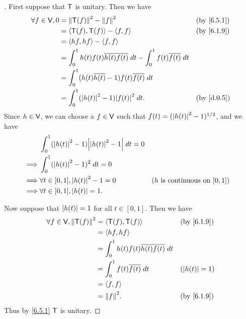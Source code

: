 \begin{proof}[]
  First suppose that \(\mathsf{T}\) is unitary.
  Then we have
  \begin{align*}
    \forall f \in \V, 0 & = \norm{\T(f)}^2 - \norm{f}^2                                                 &  & \by{6.5.1} \\
                        & = \inn{\T(f), \T(f)} - \inn{f, f}                                             &  & \by{6.1.9} \\
                        & = \inn{hf, hf} - \inn{f, f}                                                                   \\
                        & = \int_0^1 h(t) f(t) \conj{h(t) f(t)} \; dt - \int_0^1 f(t) \conj{f(t)} \; dt                 \\
                        & = \int_0^1 (h(t) \conj{h(t)} - 1) f(t) \conj{f(t)} \; dt                                      \\
                        & = \int_0^1 (\abs{h(t)}^2 - 1) \abs{f(t)}^2 \; dt.                             &  & \by{d.0.5}
  \end{align*}
  Since \(h \in \mathsf{V}\), we can choose a \(f \in \mathsf{V}\) such that \(f(t) = (\left\lvert h(t)\right\rvert^2 - 1)^{1 / 2}\), and we have
  \begin{align*}
             & \int_0^1 (\abs{h(t)}^2 - 1) \abs{\abs{h(t)}^2 - 1} \; dt = 0                                                 \\
    \implies & \int_0^1 (\abs{h(t)}^2 - 1)^2 \; dt = 0                                                                      \\
    \implies & \forall t \in [0, 1], \abs{h(t)}^2 - 1 = 0                   &  & \text{(\(h\) is continuous on \([0, 1]\))} \\
    \implies & \forall t \in [0, 1], \abs{h(t)} = 1.
  \end{align*}

  Now suppose that \(\left\lvert h(t)\right\rvert = 1\) for all \(t \in [0, 1]\).
  Then we have
  \begin{align*}
    \forall f \in \V, \norm{\T(f)}^2 & = \inn{\T(f), \T(f)}                        &  & \by{6.1.9}       \\
                                     & = \inn{hf, hf}                                                    \\
                                     & = \int_0^1 h(t) f(t) \conj{h(t) f(t)} \; dt                       \\
                                     & = \int_0^1 f(t) \conj{f(t)} \; dt           &  & (\abs{h(t)} = 1) \\
                                     & = \inn{f, f}                                                      \\
                                     & = \norm{f}^2.                               &  & \by{6.1.9}
  \end{align*}
  Thus by \cref{6.5.1} \(\mathsf{T}\) is unitary.
\end{proof}

